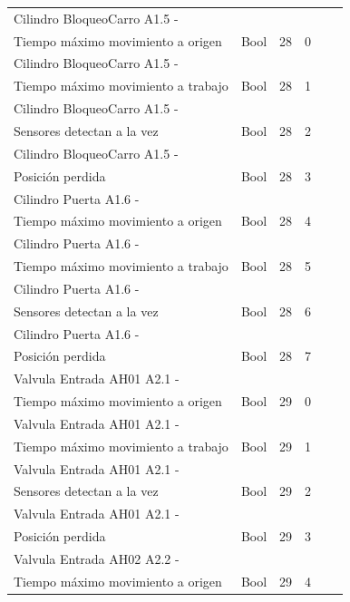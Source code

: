 \documentclass{tfgitic}[2022/06/30]
\begin{document}
\begin{table}[h]
\begin{tabular}{
>{\columncolor[HTML]{EBEAEA}}llllll}
Cilindro BloqueoCarro A1.5 -\\ Tiempo máximo movimiento a origen& Bool & 28 & 0 \\
Cilindro BloqueoCarro A1.5 -\\Tiempo máximo movimiento a trabajo& Bool & 28 & 1 \\
Cilindro BloqueoCarro A1.5 -\\Sensores detectan a la vez& Bool & 28 & 2 \\
Cilindro BloqueoCarro A1.5 -\\Posición perdida& Bool & 28 & 3 \\
Cilindro Puerta A1.6 -\\ Tiempo máximo movimiento a origen& Bool & 28 & 4 \\
Cilindro Puerta A1.6 -\\Tiempo máximo movimiento a trabajo& Bool & 28 & 5 \\
Cilindro Puerta A1.6 -\\Sensores detectan a la vez& Bool & 28 & 6 \\
Cilindro Puerta A1.6 -\\Posición perdida& Bool & 28 & 7 \\
Valvula Entrada AH01 A2.1 -\\Tiempo máximo movimiento a origen& Bool & 29 & 0 \\
Valvula Entrada AH01 A2.1 -\\Tiempo máximo movimiento a trabajo& Bool & 29 & 1 \\
Valvula Entrada AH01 A2.1 -\\Sensores detectan a la vez& Bool & 29 & 2 \\
Valvula Entrada AH01 A2.1 -\\Posición perdida& Bool & 29 & 3 \\
Valvula Entrada AH02 A2.2 -\\Tiempo máximo movimiento a origen& Bool & 29 & 4 \\
\end{tabular}
\end{table}
\end{document}
